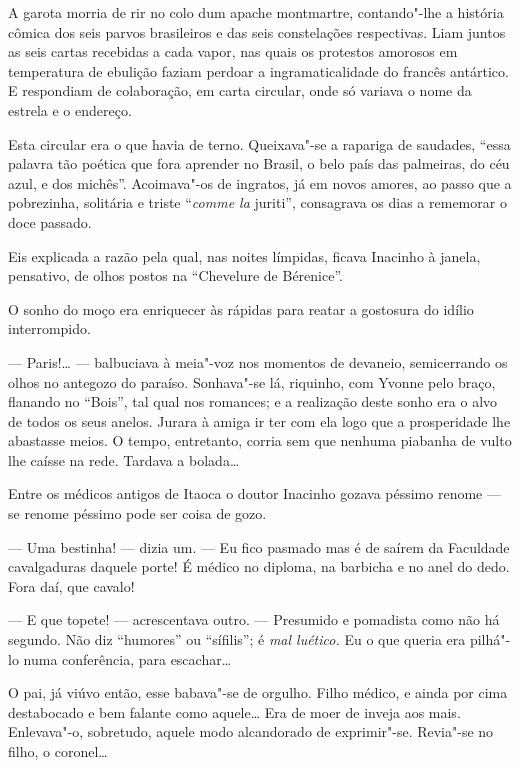 A garota morria de rir no colo dum apache montmartre, contando"-lhe a
história cômica dos seis parvos brasileiros e das seis constelações
respectivas. Liam juntos as seis cartas recebidas a cada vapor, nas
quais os protestos amorosos em temperatura de ebulição faziam perdoar a
ingramaticalidade do francês antártico. E respondiam de colaboração, em
carta circular, onde só variava o nome da estrela e o endereço.

Esta circular era o que havia de terno. Queixava"-se a rapariga de
saudades, ``essa palavra tão poética que fora aprender no Brasil, o belo
país das palmeiras, do céu azul, e dos michês''. Acoimava"-os de
ingratos, já em novos amores, ao passo que a pobrezinha, solitária e
triste ``\emph{comme la} juriti'', consagrava os dias a rememorar o doce
passado.

Eis explicada a razão pela qual, nas noites límpidas, ficava Inacinho à
janela, pensativo, de olhos postos na ``Chevelure de Bérenice''.

O sonho do moço era enriquecer às rápidas para reatar a gostosura do
idílio interrompido.

--- Paris!\ldots{} --- balbuciava à meia"-voz nos momentos de devaneio,
semicerrando os olhos no antegozo do paraíso. Sonhava"-se lá, riquinho,
com Yvonne pelo braço, flanando no ``Bois'', tal qual nos romances; e a
realização deste sonho era o alvo de todos os seus anelos. Jurara à
amiga ir ter com ela logo que a prosperidade lhe abastasse meios. O
tempo, entretanto, corria sem que nenhuma piabanha de vulto lhe caísse
na rede. Tardava a bolada\ldots{}

Entre os médicos antigos de Itaoca o doutor Inacinho gozava péssimo
renome --- se renome péssimo pode ser coisa de gozo.

--- Uma bestinha! --- dizia um. --- Eu fico pasmado mas é de saírem da
Faculdade cavalgaduras daquele porte! É médico no diploma, na barbicha e
no anel do dedo. Fora daí, que cavalo!

--- E que topete! --- acrescentava outro. --- Presumido e pomadista como
não há segundo. Não diz ``humores'' ou ``sífilis''; é \emph{mal
luético.} Eu o que queria era pilhá"-lo numa conferência, para
escachar\ldots{}

O pai, já viúvo então, esse babava"-se de orgulho. Filho médico, e ainda
por cima destabocado e bem falante como aquele\ldots{} Era de moer de inveja
aos mais. Enlevava"-o, sobretudo, aquele modo alcandorado de exprimir"-se.
Revia"-se no filho, o coronel\ldots{}

